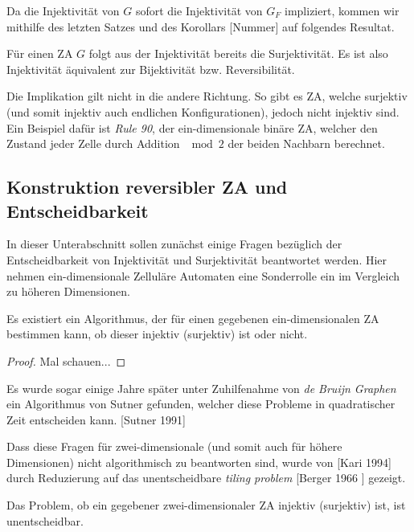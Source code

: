 Da die Injektivität von $G$ sofort die Injektivität von $G_F$ impliziert, kommen wir mithilfe des letzten Satzes und des Korollars [Nummer] auf folgendes Resultat.

\begin{corollary}
  Für einen ZA $G$ folgt aus der Injektivität bereits die Surjektivität. Es ist also Injektivität äquivalent zur Bijektivität bzw. Reversibilität.
\end{corollary}

\begin{remark}
  Die Implikation gilt nicht in die andere Richtung. So gibt es ZA, welche surjektiv (und somit injektiv auch endlichen Konfigurationen), jedoch nicht injektiv sind. Ein Beispiel dafür ist \textit{Rule 90}, der ein-dimensionale binäre ZA, welcher den Zustand jeder Zelle durch Addition $\mod 2$ der beiden Nachbarn berechnet. %
\end{remark}


\subsection{Konstruktion reversibler ZA und Entscheidbarkeit}
\label{subsection:construction}

In dieser Unterabschnitt sollen zunächst einige Fragen bezüglich der Entscheidbarkeit von Injektivität und Surjektivität beantwortet werden. Hier nehmen ein-dimensionale Zelluläre Automaten eine Sonderrolle ein im Vergleich zu höheren Dimensionen.

\begin{theorem}
  Es existiert ein Algorithmus, der für einen gegebenen ein-dimensionalen ZA bestimmen kann, ob dieser injektiv (surjektiv) ist oder nicht.
\end{theorem}

\begin{proof}
  Mal schauen...
\end{proof}

Es wurde sogar einige Jahre später unter Zuhilfenahme von \textit{de Bruijn Graphen} ein Algorithmus von Sutner gefunden, welcher diese Probleme in quadratischer Zeit entscheiden kann. [Sutner 1991]

Dass diese Fragen für zwei-dimensionale (und somit auch für höhere Dimensionen) nicht algorithmisch zu beantworten sind, wurde von [Kari 1994] durch Reduzierung auf das unentscheidbare \textit{tiling problem} [Berger 1966 ] gezeigt.

\begin{theorem}
  Das Problem, ob ein gegebener zwei-dimensionaler ZA injektiv (surjektiv) ist, ist unentscheidbar.
\end{theorem}

